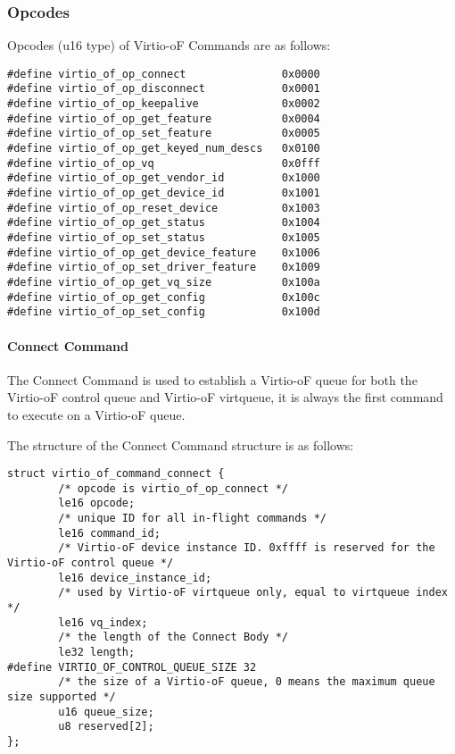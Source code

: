\subsubsection{Opcodes}\label{sec:Virtio Transport Options / Virtio Over Fabrics / Commands Definition / Opcodes}
Opcodes (u16 type) of Virtio-oF Commands are as follows:

\begin{lstlisting}
#define virtio_of_op_connect               0x0000
#define virtio_of_op_disconnect            0x0001
#define virtio_of_op_keepalive             0x0002
#define virtio_of_op_get_feature           0x0004
#define virtio_of_op_set_feature           0x0005
#define virtio_of_op_get_keyed_num_descs   0x0100
#define virtio_of_op_vq                    0x0fff
#define virtio_of_op_get_vendor_id         0x1000
#define virtio_of_op_get_device_id         0x1001
#define virtio_of_op_reset_device          0x1003
#define virtio_of_op_get_status            0x1004
#define virtio_of_op_set_status            0x1005
#define virtio_of_op_get_device_feature    0x1006
#define virtio_of_op_set_driver_feature    0x1009
#define virtio_of_op_get_vq_size           0x100a
#define virtio_of_op_get_config            0x100c
#define virtio_of_op_set_config            0x100d
\end{lstlisting}

\paragraph{Connect Command}\label{sec:Virtio Transport Options / Virtio Over Fabrics / Commands Definition / Opcodes / Connect Command}

The Connect Command is used to establish a Virtio-oF queue for both the Virtio-oF control queue and Virtio-oF virtqueue, it is always the first command to execute on a Virtio-oF queue.

The structure of the Connect Command structure is as follows:
\begin{lstlisting}
struct virtio_of_command_connect {
        /* opcode is virtio_of_op_connect */
        le16 opcode;
        /* unique ID for all in-flight commands */
        le16 command_id;
        /* Virtio-oF device instance ID. 0xffff is reserved for the Virtio-oF control queue */
        le16 device_instance_id;
        /* used by Virtio-oF virtqueue only, equal to virtqueue index */
        le16 vq_index;
        /* the length of the Connect Body */
        le32 length;
#define VIRTIO_OF_CONTROL_QUEUE_SIZE 32
        /* the size of a Virtio-oF queue, 0 means the maximum queue size supported */
        u16 queue_size;
        u8 reserved[2];
};
\end{lstlisting}


